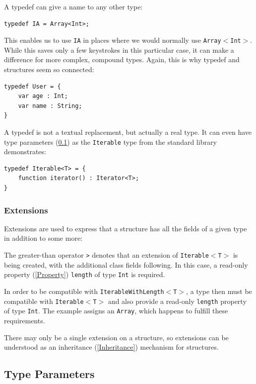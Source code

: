 \documentclass{article}
\newcommand{\type}[1]{\texttt{#1}}
\newcommand{\expr}[1]{\texttt{#1}}
\newcommand{\tref}[2]{#1 (\ref{#2})}
\begin{document}
A typedef can give a name to any other type:

\begin{lstlisting}
typedef IA = Array<Int>;
\end{lstlisting}
This enables us to use \expr{IA} in places where we would normally use \expr{Array$<$Int$>$}. While this saves only a few keystrokes in this particular case, it can make a difference for more complex, compound types. Again, this is why typedef and structures seem so connected:

\begin{lstlisting}
typedef User = {
    var age : Int;
    var name : String;
}
\end{lstlisting}
A typedef is not a textual replacement, but actually a real type. It can even have \tref{type parameters}{Type Parameters} as the \type{Iterable} type from the standard library demonstrates:

\begin{lstlisting}
typedef Iterable<T> = {
	function iterator() : Iterator<T>;
}
\end{lstlisting}



\subsubsection{Extensions}

Extensions are used to express that a structure has all the fields of a given type in addition to some more:


The greater-than operator \expr{>} denotes that an extension of \type{Iterable$<$T$>$} is being created, with the additional class fields following. In this case, a read-only \tref{property}{Property} \expr{length} of type \type{Int} is required.

In order to be compatible with \type{IterableWithLength$<$T$>$}, a type then must be compatible with \type{Iterable$<$T$>$} and also provide a read-only \expr{length} property of type \type{Int}. The example assigns an \type{Array}, which happens to fulfill these requirements.

There may only be a single extension on a structure, so extensions can be understood as an \tref{inheritance}{Inheritance} mechanism for structures.




\subsection{Type Parameters}
\label{Type Parameters}
\end{document}
